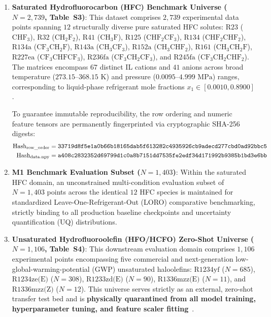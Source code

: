 \begin{enumerate}
    \item \textbf{Saturated Hydrofluorocarbon (HFC) Benchmark Universe ($N = 2,739$, Table~S3)}: 
    This dataset comprises $2,739$ experimental data points spanning $12$ structurally diverse pure saturated HFC solutes: $\text{R23}$ ($\text{CHF}_3$), $\text{R32}$ ($\text{CH}_2\text{F}_2$), $\text{R41}$ ($\text{CH}_3\text{F}$), $\text{R125}$ ($\text{CHF}_2\text{CF}_3$), $\text{R134}$ ($\text{CHF}_2\text{CHF}_2$), $\text{R134a}$ ($\text{CF}_3\text{CH}_2\text{F}$), $\text{R143a}$ ($\text{CH}_3\text{CF}_3$), $\text{R152a}$ ($\text{CH}_3\text{CHF}_2$), $\text{R161}$ ($\text{CH}_3\text{CH}_2\text{F}$), $\text{R227ea}$ ($\text{CF}_3\text{CHFCF}_3$), $\text{R236fa}$ ($\text{CF}_3\text{CH}_2\text{CF}_3$), and $\text{R245fa}$ ($\text{CF}_3\text{CH}_2\text{CHF}_2$). The matrices encompass $67$ distinct IL cations and $41$ anions across broad temperature ($273.15\text{--}368.15\text{ K}$) and pressure ($0.0095\text{--}4.999\text{ MPa}$) ranges, corresponding to liquid-phase refrigerant mole fractions $x_1 \in [0.0010, 0.8900]$.
    
    To guarantee immutable reproducibility, the row ordering and numeric feature tensors are permanently fingerprinted via cryptographic SHA-256 digests:
    \begin{align}
        \text{Hash}_{\rm row\_order} &= \texttt{33719d8f5e1a0b66b18165dab5f613282c4935926cb9adecd277cbd0ad92bbc5} \\
        \text{Hash}_{\rm data.npy} &= \texttt{a408c2832352d69799d1c0a8b7151dd7535fe2edf34d171992b9385b1bd3e6bb}
    \end{align}

    \item \textbf{M1 Benchmark Evaluation Subset ($N = 1,403$)}: 
    Within the saturated HFC domain, an unconstrained multi-condition evaluation subset of $N = 1,403$ points across the identical $12$ HFC species is maintained for standardized Leave-One-Refrigerant-Out (LORO) comparative benchmarking, strictly binding to all production baseline checkpoints and uncertainty quantification (UQ) distributions.

    \item \textbf{Unsaturated Hydrofluoroolefin (HFO/HCFO) Zero-Shot Universe ($N = 1,106$, Table~S4)}: 
    This downstream evaluation domain comprises $1,106$ experimental points encompassing five commercial and next-generation low-global-warming-potential (GWP) unsaturated haloolefins: $\text{R1234yf}$ ($N=685$), $\text{R1234ze(E)}$ ($N=308$), $\text{R1233zd(E)}$ ($N=90$), $\text{R1336mzz(E)}$ ($N=11$), and $\text{R1336mzz(Z)}$ ($N=12$). This universe serves strictly as an external, zero-shot transfer test bed and is \textbf{physically quarantined from all model training, hyperparameter tuning, and feature scaler fitting}~\cite{Li2023_NatCommun}.


\end{enumerate}
